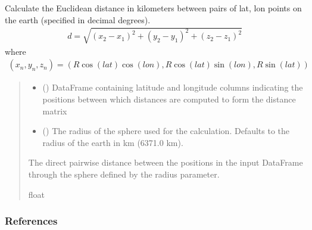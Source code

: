 \documentclass[letterpaper,10pt,english]{sphinxmanual}
\begin{document}
\begin{fulllineitems}
\label{\detokenize{misc:glomar_gridding.distances.euclidean_distance}}
\pysigstartsignatures
\pysiglinewithargsret
{}
{\sphinxparamcomma {}}
{}
\pysigstopsignatures
\sphinxAtStartPar
Calculate the Euclidean distance in kilometers between pairs of lat, lon
points on the earth (specified in decimal degrees).
\begin{equation*}
\begin{split}d = \sqrt{(x_2 - x_1)^2 + (y_2 - y_1)^2 + (z_2 - z_1)^2}\end{split}
\end{equation*}
\sphinxAtStartPar
where
\begin{equation*}
\begin{split}(x_n, y_n, z_n) = (R\cos(lat)\cos(lon), R\cos(lat)\sin(lon), R\sin(lat))\end{split}
\end{equation*}\begin{quote}\begin{description}
\begin{itemize}
\item {}
\sphinxAtStartPar
{} () \textendash{} DataFrame containing latitude and longitude columns indicating the
positions between which distances are computed to form the distance
matrix

\item {}
\sphinxAtStartPar
{} () \textendash{} The radius of the sphere used for the calculation. Defaults to the
radius of the earth in km (6371.0 km).

\end{itemize}

\sphinxAtStartPar
{} \textendash{} The direct pairwise distance between the positions in the input
DataFrame through the sphere defined by the radius parameter.

\sphinxAtStartPar
float

\end{description}\end{quote}
\subsubsection*{References}

\sphinxAtStartPar
{}

\end{fulllineitems}
\end{document}
